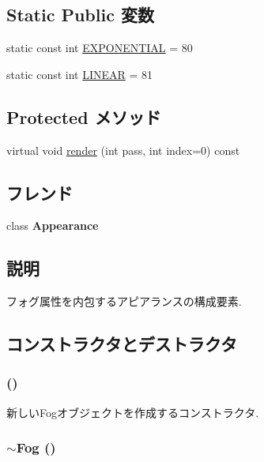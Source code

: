 \subsection*{Static Public 変数}
\begin{CompactItemize}
\item 
static const int \hyperlink{classm3g_1_1Fog_86b391da2e58c0448712a10f6609a62c}{EXPONENTIAL} = 80
\item 
static const int \hyperlink{classm3g_1_1Fog_23ccf193c67257f1be26417041cecb31}{LINEAR} = 81
\end{CompactItemize}
\subsection*{Protected メソッド}
\begin{CompactItemize}
\item 
virtual void \hyperlink{classm3g_1_1Fog_1efcb1973989d9963d5bd6d03065d389}{render} (int pass, int index=0) const 
\end{CompactItemize}
\subsection*{フレンド}
\begin{CompactItemize}
\item 
\hypertarget{classm3g_1_1Fog_afa5201a494f65c37039281d9b63a2a9}{
class \textbf{Appearance}}
\label{classm3g_1_1Fog_afa5201a494f65c37039281d9b63a2a9}

\end{CompactItemize}


\subsection{説明}
フォグ属性を内包するアピアランスの構成要素. 

\subsection{コンストラクタとデストラクタ}
\hypertarget{classm3g_1_1Fog_232ea9c5f5824d924fa185401fbfb234}{
\subsubsection[{Fog}]{ ()}}
\label{classm3g_1_1Fog_232ea9c5f5824d924fa185401fbfb234}


新しいFogオブジェクトを作成するコンストラクタ. \hypertarget{classm3g_1_1Fog_c13d77e65284ed8f7480c8f83ed9780f}{
\subsubsection[{$\sim$Fog}]{\setlength{\rightskip}{0pt plus 5cm}$\sim${\bf Fog} ()}}
\label{classm3g_1_1Fog_c13d77e65284ed8f7480c8f83ed9780f}


